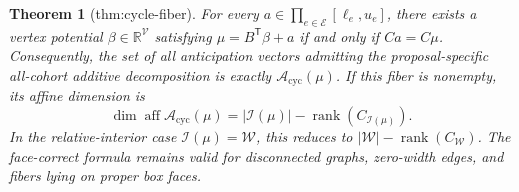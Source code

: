\documentclass{article}
\newtheorem{theorem}{Theorem}
\begin{document}
\begin{theorem}[thm:cycle-fiber]\label{thm:cycle-fiber}
For every \(a\in\prod_{e\in\mathcal E}[\ell_e,u_e]\), there exists a vertex potential \(\beta\in\mathbb R^{\mathcal V}\) satisfying \(\mu=B^{\mathsf T}\beta+a\) if and only if \(Ca=C\mu\). Consequently, the set of all anticipation vectors admitting the proposal-specific all-cohort additive decomposition is exactly \(\mathcal A_{\mathrm{cyc}}(\mu)\). If this fiber is nonempty, its affine dimension is \[\dim\operatorname{aff}\mathcal A_{\mathrm{cyc}}(\mu)=|\mathcal I(\mu)|-\operatorname{rank}(C_{\mathcal I(\mu)}).\] In the relative-interior case \(\mathcal I(\mu)=\mathcal W\), this reduces to \(|\mathcal W|-\operatorname{rank}(C_{\mathcal W})\). The face-correct formula remains valid for disconnected graphs, zero-width edges, and fibers lying on proper box faces.
\end{theorem}
\end{document}
